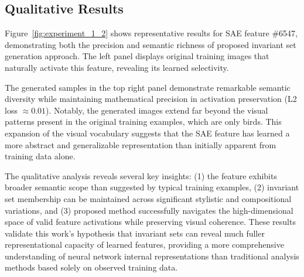 \documentclass[licencjacka,en]{pracamgr}
\begin{document}
\subsection{Qualitative Results}

Figure~\ref{fig:experiment_1_2} shows representative results for SAE feature \#6547, demonstrating both the precision and semantic richness of proposed invariant set generation approach. The left panel displays original training images that naturally activate this feature, revealing its learned selectivity.

The generated samples in the top right panel demonstrate remarkable semantic diversity while maintaining mathematical precision in activation preservation (L2 loss $\approx 0.01$). Notably, the generated images extend far beyond the visual patterns present in the original training examples, which are only birds. This expansion of the visual vocabulary suggests that the SAE feature has learned a more abstract and generalizable representation than initially apparent from training data alone.

The qualitative analysis reveals several key insights: (1) the feature exhibits broader semantic scope than suggested by typical training examples, (2) invariant set membership can be maintained across significant stylistic and compositional variations, and (3) proposed method successfully navigates the high-dimensional space of valid feature activations while preserving visual coherence. These results validate this work's hypothesis that invariant sets can reveal much fuller representational capacity of learned features, providing a more comprehensive understanding of neural network internal representations than traditional analysis methods based solely on observed training data.
\end{document}

